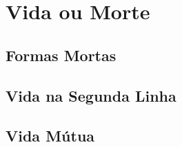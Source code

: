 \part{Vida ou Morte}




% 
% 
% 

\chapter{Formas Mortas}
\emptypage

\chapter{Vida na Segunda Linha}
\emptypage

\chapter{Vida Mútua}
\emptypage